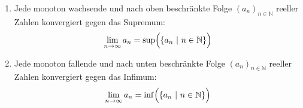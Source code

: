 \begin{enumerate}[label=\alph*),leftmargin=*]
    \item Jede monoton wachsende und nach oben beschränkte Folge $(a_n)_{n\in\mathbb{N}}$ reeller Zahlen konvergiert gegen das Supremum:
    $$\lim_{n \to \infty} a_n = \sup\Bigl(\{a_n \ | \ n \in \mathbb{N}\}\Bigl)$$
    \item Jede monoton fallende und nach unten beschränkte Folge $(a_n)_{n\in\mathbb{N}}$ reeller Zahlen konvergiert gegen das Infimum:
    $$\lim_{n \to \infty} a_n = \inf\Bigl(\{a_n \ | \ n \in \mathbb{N}\}\Bigl)$$
\end{enumerate}
